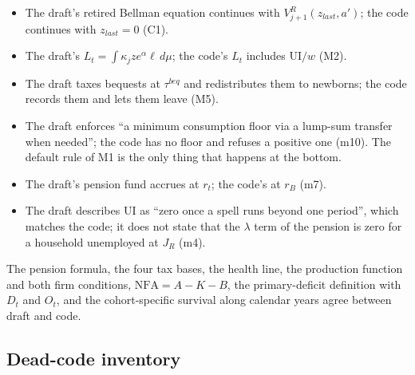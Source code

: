 \documentclass[11pt,a4paper]{article}
\begin{document}
\begin{itemize}
\item The draft's retired Bellman equation continues with $V^R_{j+1}(z_{last}, a')$; the code continues with $z_{last} = 0$ (C1).
\item The draft's $L_t = \int \kappa_j z e^{\alpha}\ell\, d\mu$; the code's $L_t$ includes UI$/w$ (M2).
\item The draft taxes bequests at $\tau^{beq}$ and redistributes them to newborns; the code records them and lets them leave (M5).
\item The draft enforces ``a minimum consumption floor via a lump-sum transfer when needed''; the code has no floor and refuses a positive one (m10). The default rule of M1 is the only thing that happens at the bottom.
\item The draft's pension fund accrues at $r_t$; the code's at $r_B$ (m7).
\item The draft describes UI as ``zero once a spell runs beyond one period'', which matches the code; it does not state that the $\lambda$ term of the pension is zero for a household unemployed at $J_R$ (m4).
\end{itemize}
The pension formula, the four tax bases, the health line, the production function and both firm conditions, $\mathrm{NFA} = A - K - B$, the primary-deficit definition with $D_t$ and $O_t$, and the cohort-specific survival along calendar years agree between draft and code.

\subsection{Dead-code inventory}
\end{document}
